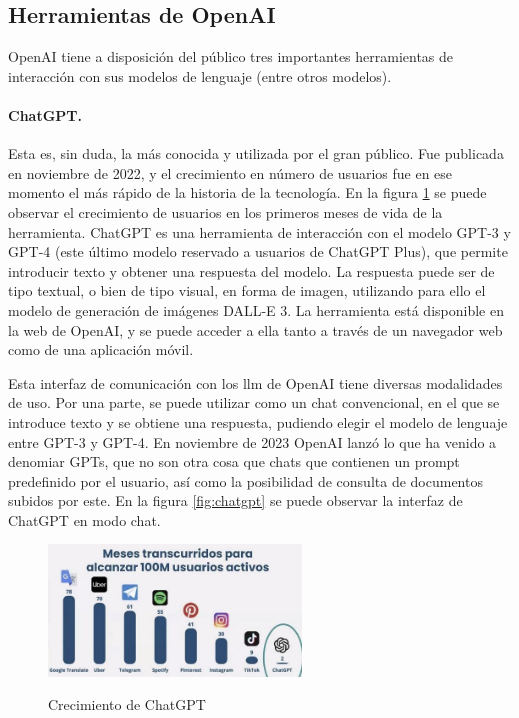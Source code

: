 \subsection{Herramientas de OpenAI}

OpenAI tiene a disposición del público tres importantes herramientas de interacción con sus modelos de lenguaje (entre otros modelos). 

    \paragraph{ChatGPT.} Esta es, sin duda, la más conocida y utilizada por el gran público. Fue publicada en noviembre de 2022, y el crecimiento en número de usuarios fue en ese momento el más rápido de la historia de la tecnología. En la figura \ref{fig:crecimiento_chatgpt} se puede observar el crecimiento de usuarios en los primeros meses de vida de la herramienta. ChatGPT es una herramienta de interacción con el modelo GPT-3 y GPT-4 (este último modelo reservado a usuarios de ChatGPT Plus), que permite introducir texto y obtener una respuesta del modelo. La respuesta puede ser de tipo textual, o bien de tipo visual, en forma de imagen, utilizando para ello el modelo de generación de imágenes DALL-E 3. La herramienta está disponible en la web de OpenAI, y se puede acceder a ella tanto a través de un navegador web como de una aplicación móvil.

    Esta interfaz de comunicación con los \gls{llm} de OpenAI tiene diversas modalidades de uso. Por una parte, se puede utilizar como un chat convencional, en el que se introduce texto y se obtiene una respuesta, pudiendo elegir el modelo de lenguaje entre GPT-3 y GPT-4. En noviembre de 2023 OpenAI lanzó lo que ha venido a denomiar GPTs, que no son otra cosa que chats que contienen un prompt predefinido por el usuario, así como la posibilidad de consulta de documentos subidos por este. En la figura \ref{fig:chatgpt} se puede observar la interfaz de ChatGPT en modo chat.

    \begin{figure}[h]
        \caption[Crecimiento de ChatGPT]{Crecimiento de ChatGPT}
        \centering
        \includegraphics[width=0.6\textwidth]{./figuras/100millonesUsuariosChatgpt.jpeg}
        \label{fig:crecimiento_chatgpt}
    \end{figure}

